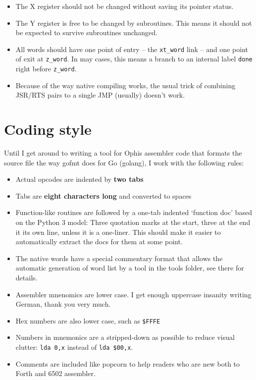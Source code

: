 \begin{itemize}
\item The X register should not be changed without saving its pointer status.

\item The Y register is free to be changed by subroutines. This means it should
not be expected to survive subroutines unchanged.

\item All words should have one point of entry -- the \texttt{xt\_word} link --
and one point of exit at \texttt{z\_word}. In may cases, this means a branch to an
internal label \texttt{done} right before \texttt{z\_word}.

\item Because of the way native compiling works, the usual trick of combining
JSR/RTS pairs to a single JMP (usually) doesn't work.
\end{itemize}


\section{Coding style}

Until I get around to writing a tool for Ophis assembler code that formats the
source file the way gofmt does for Go (golang), I work with the following
rules:

\begin{itemize}
\item Actual opcodes are indented by \textbf{two tabs}

\item Tabs are \textbf{eight characters long} and converted to spaces

\item Function-like routines are followed by a one-tab indented `function doc'
based on the Python 3 model: Three quotation marks at the start, three at the
end it its own line, unless it is a one-liner. This should make it easier to
automatically extract the docs for them at some point.

\item The native words have a special commentary format that allows the automatic
  generation of word list by a tool in the tools folder, see there for details.

\item Assembler mnenomics are lower case. I get enough uppercase insanity writing
  German, thank you very much.

\item Hex numbers are also lower case, such as \texttt{\$FFFE}

\item Numbers in mnemonics are a stripped-down as possible to reduce visual clutter:
  \texttt{lda 0,x} instead of \texttt{lda \$00,x}.

\item Comments are included like popcorn to help readers who are new both to Forth
  and 6502 assembler.

\end{itemize}


